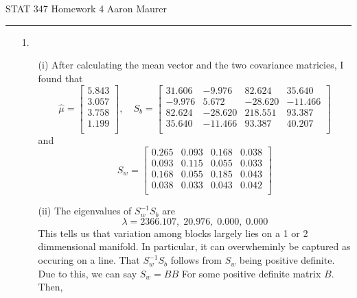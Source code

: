 \documentclass[11pt]{article}
\theoremstyle{definition}
\newcommand{\hwhead}[1]{#1 \hfill Aaron Maurer \vspace{2mm} \hrule \vspace{2mm}}
\begin{document}
\hwhead{STAT 347 Homework 4}
\begin{itemize}
    \item[1.]
        \begin{itemize}
            \item[(i)]
                After calculating the mean vector and the two covariance matricies, I found that
                \[ 
                    \hat\mu = \left[\begin{array}{c} 5.843 \\ 3.057 \\ 3.758 \\ 1.199 \\ \end{array}\right], \quad
                    S_b = \left[\begin{array}{cccc}  
                              31.606 & -9.976 & 82.624 & 35.640 \\ 
                              -9.976 & 5.672 & -28.620 & -11.466 \\ 
                              82.624 & -28.620 & 218.551 & 93.387 \\ 
                              35.640 & -11.466 & 93.387 & 40.207 \\ 
                        \end{array}\right]
                    \]
                and
                \[
                    S_w = \left[\begin{array}{cccc}
                            0.265 & 0.093 & 0.168 & 0.038 \\ 
                            0.093 & 0.115 & 0.055 & 0.033 \\ 
                            0.168 & 0.055 & 0.185 & 0.043 \\ 
                            0.038 & 0.033 & 0.043 & 0.042 \\
                        \end{array}\right]
                \]
            \item[(ii)]
                The eigenvalues of $S_w^{-1}S_b$ are 
                \[\lambda = 2366.107,\; 20.976, \; 0.000, \; 0.000\]
                This tells us that variation among blocks largely lies on a 1 or 2 dimmensional manifold. In particular, it can overwheminly be captured as occuring on a line. That $S_w^{-1}S_b$ follows from $S_w$ being positive definite. Due to this, we can say $S_w=BB$ For some positive definite matrix $B$. Then,

\end{itemize}
\end{itemize}
\end{document}
